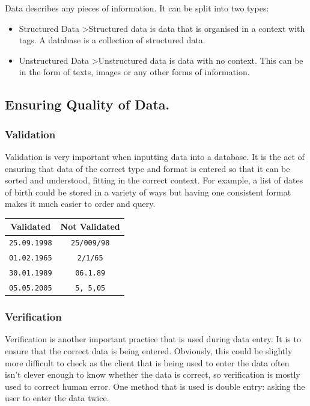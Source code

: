 Data describes any pieces of information. It can be split into two types:

\begin{itemize}
\item
  Structured Data \textgreater{}Structured data is data that is organised in a context with tags. A database is a collection of structured data.
\item
  Unstructured Data \textgreater{}Unstructured data is data with no context. This can be in the form of texts, images or any other forms of information.
\end{itemize}

\hypertarget{ensuring-quality-of-data.}{%
\subsection{Ensuring Quality of Data.}\label{ensuring-quality-of-data.}}

\hypertarget{validation}{%
\subsubsection{Validation}\label{validation}}

Validation is very important when inputting data into a database. It is the act of ensuring that data of the correct type and format is entered so that it can be sorted and understood, fitting in the correct context. For example, a list of dates of birth could be stored in a variety of ways but having one consistent format makes it much easier to order and query.

\begin{longtable}[]{@{}cc@{}}
\toprule
Validated & Not Validated\tabularnewline
\midrule
\endhead
\texttt{25.09.1998} & \texttt{25/009/98}\tabularnewline
\texttt{01.02.1965} & \texttt{2/1/65}\tabularnewline
\texttt{30.01.1989} & \texttt{06.1.89}\tabularnewline
\texttt{05.05.2005} & \texttt{5,\ 5,05}\tabularnewline
\bottomrule
\end{longtable}

\hypertarget{verification}{%
\subsubsection{Verification}\label{verification}}

Verification is another important practice that is used during data entry. It is to ensure that the correct data is being entered. Obviously, this could be slightly more difficult to check as the client that is being used to enter the data often isn't clever enough to know whether the data is correct, so verification is mostly used to correct human error. One method that is used is double entry: asking the user to enter the data twice.

